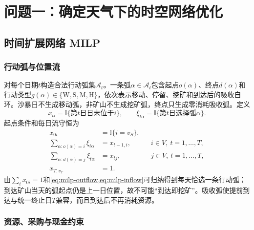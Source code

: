 \section{问题一：确定天气下的时空网络优化}

\subsection{时间扩展网络 MILP}

\subsubsection{行动弧与位置流}

对每个日期$t$构造合法行动弧集$\mathcal A_t$。一条弧$\alpha\in\mathcal A_t$包含起点$o(\alpha)$、终点$d(\alpha)$和行动类型$g(\alpha)\in\{\mathrm W,\mathrm S,\mathrm M,\mathrm H\}$，依次表示移动、停留、挖矿和到达后的吸收自环。沙暴日不生成移动弧，非矿山不生成挖矿弧，终点只生成零消耗吸收弧。定义
\[
x_{ti}=\mathbb I\{\text{第$t$日日末位于$i$}\},\qquad
\xi_{t\alpha}=\mathbb I\{\text{第$t$日选择弧$\alpha$}\}.
\]
起点条件和每日流守恒为
\begin{align}
x_{0i}&=\mathbb I\{i=v_S\},\label{eq:milp-start}\\
\sum_{\alpha:o(\alpha)=i}\xi_{t\alpha}&=x_{t-1,i},
&&i\in V,\ t=1,\ldots,T,\label{eq:milp-outflow}\\
\sum_{\alpha:d(\alpha)=j}\xi_{t\alpha}&=x_{tj},
&&j\in V,\ t=1,\ldots,T,\label{eq:milp-inflow}\\
x_{T,v_T}&=1.\label{eq:milp-finish}
\end{align}
由$\sum_i x_{0i}=1$和\cref{eq:milp-outflow,eq:milp-inflow}可归纳得到每天恰选一条行动弧；到达矿山当天的弧起点仍是上一日位置，故不可能“到达即挖矿”。吸收弧使提前到达与统一终止日$T$兼容，而且到达后不再消耗资源。

\subsubsection{资源、采购与现金约束}

